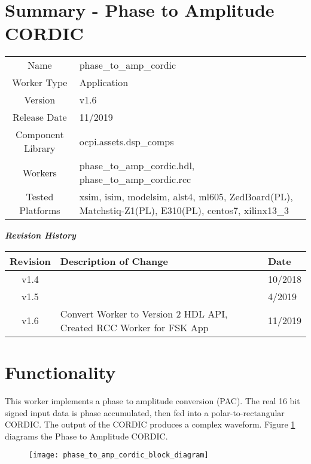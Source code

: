\documentclass{article}
\author{} %
\date{Version \docVersion} %
\title{\docTitle}
\def\docVersion{1.6}
\def\comp{phase\_to\_amp\_cordic}
\def\Comp{Phase to Amplitude CORDIC}
\begin{document}
\section*{Summary - \Comp}
\begin{tabular}{|c|M{13.5cm}|}
	\hline
	                  &                                                    \\
	\hline
	Name              & \comp                                              \\
	\hline
	Worker Type       & Application                                        \\
	\hline
	Version           & v\docVersion \\
	\hline
	Release Date      & 11/2019 \\
	\hline
	Component Library & ocpi.assets.dsp\_comps                              \\
	\hline
	Workers           & \comp.hdl, \comp.rcc                                                                                   \\
	\hline
	Tested Platforms  & xsim, isim, modelsim, alst4, ml605, ZedBoard(PL), Matchstiq-Z1(PL), E310(PL), centos7, xilinx13\_3 \\
	\hline
\end{tabular}

\begin{center}
	\textit{\textbf{Revision History}}
	\begin{table}[H]
	\label{table:revisions} %
		\begin{tabularx}{\textwidth}{|c|X|l|}
		\hline
		\rowcolor{blue}
		\textbf{Revision} & \textbf{Description of Change} & \textbf{Date} \\
		\hline
		v1.4 & & 10/2018 \\
		\hline
		v1.5 & & 4/2019\\
		\hline
		v1.6 & Convert Worker to Version 2 HDL API, Created RCC Worker for FSK App& 11/2019\\
		\hline
		\end{tabularx}
	\end{table}
\end{center}

\section*{Functionality}
\begin{flushleft}
	This worker implements a phase to amplitude conversion (PAC). The real 16 bit signed input data is phase accumulated, then fed into a polar-to-rectangular CORDIC. The output of the CORDIC produces a complex waveform. Figure \ref{fig:phase_to_amp_cordic} diagrams the Phase to Amplitude CORDIC.

	\begin{figure}[h]
		\centering\captionsetup{type=figure}\texttt{[image: phase\_to\_amp\_cordic\_block\_diagram]}
		\label{fig:phase_to_amp_cordic}
	\end{figure}
\end{flushleft}
\end{document}
